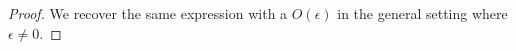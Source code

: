 \begin{proof}
We recover the same expression with a $O(\epsilon)$ in the general setting where $\epsilon\neq 0$.




\end{proof}
